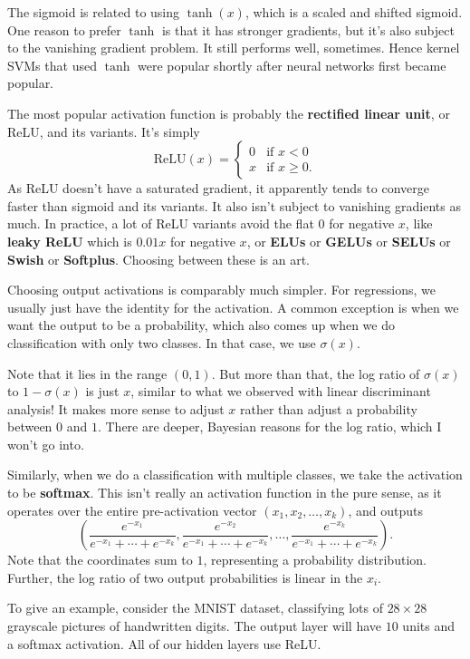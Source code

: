\documentclass[11pt,paper=letter]{scrartcl}
\begin{document}
The sigmoid is related to using $\tanh(x)$, which is a scaled and shifted sigmoid. One reason to prefer $\tanh$ is that it has stronger gradients, but it's also subject to the vanishing gradient problem. It still performs well, sometimes. Hence kernel SVMs that used $\tanh$ were popular shortly after neural networks first became popular.

The most popular activation function is probably the \textbf{rectified linear unit}, or ReLU, and its variants. It's simply \[
  \text{ReLU}(x) = \begin{cases}
  0 & \text{if } x < 0 \\
  x & \text{if } x \ge 0.
  \end{cases}
\]
As ReLU doesn't have a saturated gradient, it apparently tends to converge faster than sigmoid and its variants. It also isn't subject to vanishing gradients as much. In practice, a lot of ReLU variants avoid the flat $0$ for negative $x$, like \textbf{leaky ReLU} which is $0.01x$ for negative $x$, or \textbf{ELUs} or \textbf{GELUs} or \textbf{SELUs} or \textbf{Swish} or \textbf{Softplus}. Choosing between these is an art.

Choosing output activations is comparably much simpler. For regressions, we usually just have the identity for the activation. A common exception is when we want the output to be a probability, which also comes up when we do classification with only two classes. In that case, we use $\sigma(x)$.

Note that it lies in the range $(0, 1)$. But more than that, the log ratio of $\sigma(x)$ to $1 - \sigma(x)$ is just $x$, similar to what we observed with linear discriminant analysis! It makes more sense to adjust $x$ rather than adjust a probability between $0$ and $1$. There are deeper, Bayesian reasons for the log ratio, which I won't go into.

Similarly, when we do a classification with multiple classes, we take the activation to be \textbf{softmax}. This isn't really an activation function in the pure sense, as it operates over the entire pre-activation vector $(x_1, x_2, \ldots, x_k)$, and outputs \[
  \left(\dfrac{e^{-x_1}}{e^{-x_1} + \cdots + e^{-x_k}}, \dfrac{e^{-x_2}}{e^{-x_1} + \cdots + e^{-x_k}}, \ldots, \dfrac{e^{-x_k}}{e^{-x_1} + \cdots + e^{-x_k}}\right).
\]
Note that the coordinates sum to $1$, representing a probability distribution. Further, the log ratio of two output probabilities is linear in the $x_i$.

To give an example, consider the MNIST dataset, classifying lots of $28 \times 28$ grayscale pictures of handwritten digits. The output layer will have $10$ units and a softmax activation. All of our hidden layers use ReLU.
\end{document}
